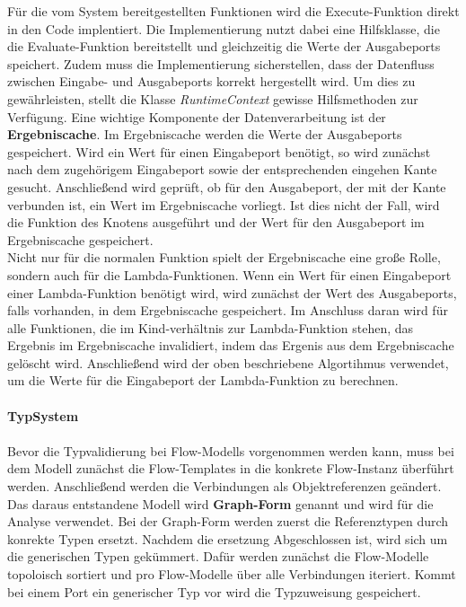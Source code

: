     Für die vom System bereitgestellten Funktionen wird die Execute-Funktion direkt in den Code implentiert. 
    Die Implementierung nutzt dabei eine Hilfsklasse, die die Evaluate-Funktion bereitstellt und gleichzeitig die Werte der Ausgabeports speichert.
    Zudem muss die Implementierung sicherstellen, dass der Datenfluss zwischen Eingabe- und Ausgabeports korrekt hergestellt wird. 
    Um dies zu gewährleisten, stellt die Klasse \textit{RuntimeContext} gewisse Hilfsmethoden zur Verfügung.
    Eine wichtige Komponente der Datenverarbeitung ist der \textbf{Ergebniscache}. 
    Im Ergebniscache werden die Werte der Ausgabeports gespeichert.
    Wird ein Wert für einen Eingabeport benötigt, so wird zunächst nach dem zugehörigem Eingabeport sowie der entsprechenden eingehen Kante gesucht. 
    Anschließend wird geprüft, ob für den Ausgabeport, der mit der Kante verbunden ist, ein Wert im Ergebniscache vorliegt.
    Ist dies nicht der Fall, wird die Funktion des Knotens ausgeführt und der Wert für den Ausgabeport im Ergebniscache gespeichert.\\
    Nicht nur für die normalen Funktion spielt der Ergebniscache eine große Rolle, sondern auch für die Lambda-Funktionen.
    Wenn ein Wert für einen Eingabeport einer Lambda-Funktion benötigt wird, wird zunächst der Wert des Ausgabeports, falls vorhanden, in dem Ergebniscache gespeichert.
    Im Anschluss daran wird für alle Funktionen, die im Kind-verhältnis zur Lambda-Funktion stehen, das Ergebnis im Ergebniscache invalidiert, indem das Ergenis aus dem Ergebniscache gelöscht wird.
    Anschließend wird der oben beschriebene Algortihmus verwendet, um die Werte für die Eingabeport der Lambda-Funktion zu berechnen.\\
    \\
    \textbf{TypSystem}\\
    \\
    Bevor die Typvalidierung bei Flow-Modells vorgenommen werden kann, muss bei dem Modell zunächst die Flow-Templates in die konkrete Flow-Instanz überführt werden. 
    Anschließend werden die Verbindungen als Objektreferenzen geändert. 
    Das daraus entstandene Modell wird \textbf{Graph-Form} genannt und wird für die Analyse verwendet.
    Bei der Graph-Form werden zuerst die Referenztypen durch konrekte Typen ersetzt. 
    Nachdem die ersetzung Abgeschlossen ist, wird sich um die generischen Typen gekümmert. 
    Dafür werden zunächst die Flow-Modelle topoloisch sortiert und pro Flow-Modelle über alle Verbindungen iteriert. 
    Kommt bei einem Port ein generischer Typ vor wird die Typzuweisung gespeichert. 
